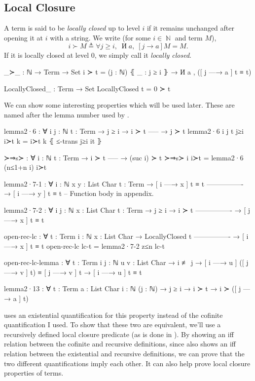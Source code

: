 \documentclass[logo,bsc,singlespacing,parskip,online]{infthesis}
\DeclareMathOperator{\nat}{\mathbb{N}}
\DeclareMathOperator{\cof}{\text{И}}
\renewenvironment{code}{\mintedcopy[breaklines,breaksymbolleft=\;]{agda}}{\endmintedcopy}
\begin{document}
\subsection{Local Closure}
A term is said to be \textit{locally closed} up to level $i$ if it remains unchanged after opening
it at $i$ with a string. We write (for some $i \in \nat$ and term $M$),
\begin{equation*}
  i \succ M \triangleq \forall j \geq i, \; \cof a , \; [j \to a] M = M.  
\end{equation*}
If it is locally closed at level $0$, we simply call it \textit{locally closed}.

\begin{code}
_≻_ : ℕ → Term → Set
i ≻ t = (j : ℕ) ⦃ _ : j ≥ i ⦄ → И a , ([ j —→ a ] t ≡ t)

LocallyClosed_ : Term → Set
LocallyClosed t = 0 ≻ t
\end{code}

We can show some interesting properties which will be used later. These are named after the lemma
number used by \citet{pitts_locally_2023}.

\begin{code}
lemma2·6 : ∀ {i j : ℕ} {t : Term}
  → j ≥ i
  → i ≻ t
    -----
  → j ≻ t
lemma2·6 {i} {j} {t} j≥i i≻t k = i≻t k ⦃ ≤-trans j≥i it ⦄

≻⇒s≻ : ∀ {i : ℕ} {t : Term}
  → i ≻ t
    -----
  → (suc i) ≻ t
≻⇒s≻ {i} i≻t = lemma2·6 (n≤1+n i) i≻t

lemma2·7-1 : ∀ {i : ℕ} {x y : List Char} {t : Term}
  → [ i —→ x ] t ≡ t
    ----------------
  → [ i —→ y ] t ≡ t
-- Function body in appendix.

lemma2·7-2 : ∀ {i j : ℕ} {x : List Char} {t : Term}
  → j ≥ i
  → i ≻ t
    ----------------
  → [ j —→ x ] t ≡ t

open-rec-lc : ∀ {t : Term} {i : ℕ} {x : List Char}
  → LocallyClosed t
    ----------------
  → [ i —→ x ] t ≡ t
open-rec-lc lc-t = lemma2·7-2 z≤n lc-t

open-rec-lc-lemma : ∀ {t : Term} {i j : ℕ} {u v : List Char}
  → i ≢ j
  → [ i —→ u ] ([ j —→ v ] t) ≡ [ j —→ v ] t
  → [ i —→ u ] t ≡ t

lemma2·13 : ∀ {t : Term} {a : List Char} {i : ℕ} (j : ℕ)
  → j ≥ i
  → i ≻ t
  → i ≻ ([ j —→ a ] t)
\end{code}

\citet{pitts_locally_2023} uses an existential quantification for this property instead of the
cofinite quantification I used. To show that these two are equivalent, we'll use a recursively
defined local closure predicate (as is done in \citet{chargueraud_locally_2012}). By showing an iff
relation between the cofinite and recursive definitions, since \citet{pitts_locally_2023} also shows
an iff relation between the existential and recursive definitions, we can prove that the two
different quantifications imply each other. It can also help prove local closure properties of terms.
\end{document}
